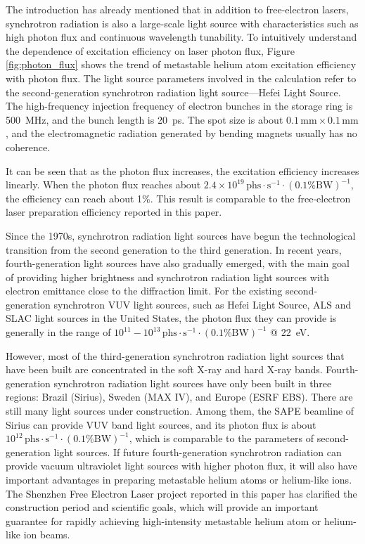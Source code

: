 \documentclass[12pt,a4paper]{article}
\begin{document}
The introduction has already mentioned that in addition to free-electron lasers, synchrotron radiation is also a large-scale light source with characteristics such as high photon flux and continuous wavelength tunability. To intuitively understand the dependence of excitation efficiency on laser photon flux, Figure \ref{fig:photon_flux} shows the trend of metastable helium atom excitation efficiency with photon flux. The light source parameters involved in the calculation refer to the second-generation synchrotron radiation light source—Hefei Light Source. The high-frequency injection frequency of electron bunches in the storage ring is \SI{500}{MHz}, and the bunch length is \SI{20}{ps}. The spot size is about $0.1 \, \text{mm} \times 0.1 \, \text{mm}$, and the electromagnetic radiation generated by bending magnets usually has no coherence.

It can be seen that as the photon flux increases, the excitation efficiency increases linearly. When the photon flux reaches about $2.4 \times 10^{19} \, \text{phs} \cdot \text{s}^{-1} \cdot (0.1\% \text{BW})^{-1}$, the efficiency can reach about 1\%. This result is comparable to the free-electron laser preparation efficiency reported in this paper.

Since the 1970s, synchrotron radiation light sources have begun the technological transition from the second generation to the third generation. In recent years, fourth-generation light sources have also gradually emerged, with the main goal of providing higher brightness and synchrotron radiation light sources with electron emittance close to the diffraction limit. For the existing second-generation synchrotron VUV light sources, such as Hefei Light Source, ALS and SLAC light sources in the United States, the photon flux they can provide is generally in the range of $10^{11} - 10^{13} \, \text{phs} \cdot \text{s}^{-1} \cdot (0.1\% \text{BW})^{-1}$ @ \SI{22}{eV}.

However, most of the third-generation synchrotron radiation light sources that have been built are concentrated in the soft X-ray and hard X-ray bands. Fourth-generation synchrotron radiation light sources have only been built in three regions: Brazil (Sirius), Sweden (MAX IV), and Europe (ESRF EBS). There are still many light sources under construction. Among them, the SAPE beamline of Sirius can provide VUV band light sources, and its photon flux is about $10^{12} \, \text{phs} \cdot \text{s}^{-1} \cdot (0.1\% \text{BW})^{-1}$, which is comparable to the parameters of second-generation light sources. If future fourth-generation synchrotron radiation can provide vacuum ultraviolet light sources with higher photon flux, it will also have important advantages in preparing metastable helium atoms or helium-like ions. The Shenzhen Free Electron Laser project reported in this paper has clarified the construction period and scientific goals, which will provide an important guarantee for rapidly achieving high-intensity metastable helium atom or helium-like ion beams.
\end{document}
